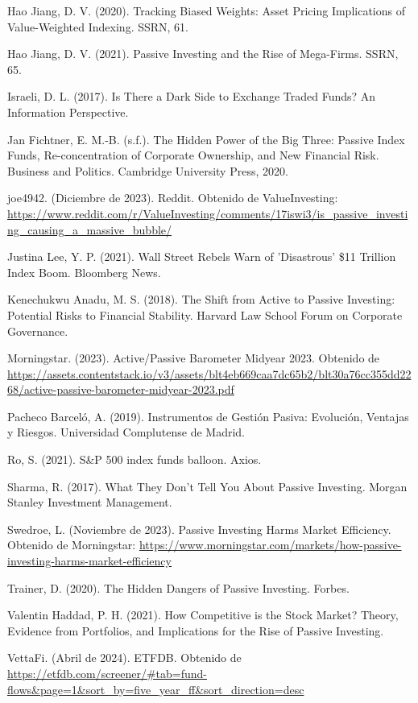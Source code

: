 \documentclass[12pt,a4paper]{article}
\begin{document}
\noindent
Hao Jiang, D. V. (2020). Tracking Biased Weights: Asset Pricing Implications of Value-Weighted Indexing. SSRN, 61.

\noindent
Hao Jiang, D. V. (2021). Passive Investing and the Rise of Mega-Firms. SSRN, 65.

\noindent
Israeli, D. L. (2017). Is There a Dark Side to Exchange Traded Funds? An Information Perspective.

\noindent
Jan Fichtner, E. M.-B. (s.f.). The Hidden Power of the Big Three: Passive Index Funds, Re-concentration of Corporate Ownership, and New Financial Risk. Business and Politics. Cambridge University Press, 2020.

\noindent
joe4942. (Diciembre de 2023). Reddit. Obtenido de ValueInvesting: \url{https://www.reddit.com/r/ValueInvesting/comments/17iswi3/is_passive_investing_causing_a_massive_bubble/}

\noindent
Justina Lee, Y. P. (2021). Wall Street Rebels Warn of 'Disastrous' \$11 Trillion Index Boom. Bloomberg News.

\noindent
Kenechukwu Anadu, M. S. (2018). The Shift from Active to Passive Investing: Potential Risks to Financial Stability. Harvard Law School Forum on Corporate Governance.

\noindent
Morningstar. (2023). Active/Passive Barometer Midyear 2023. Obtenido de \url{https://assets.contentstack.io/v3/assets/blt4eb669caa7dc65b2/blt30a76cc355dd2268/active-passive-barometer-midyear-2023.pdf}

\noindent
Pacheco Barceló, A. (2019). Instrumentos de Gestión Pasiva: Evolución, Ventajas y Riesgos. Universidad Complutense de Madrid.

\noindent
Ro, S. (2021). S\&P 500 index funds balloon. Axios.

\noindent
Sharma, R. (2017). What They Don't Tell You About Passive Investing. Morgan Stanley Investment Management.

\noindent
Swedroe, L. (Noviembre de 2023). Passive Investing Harms Market Efficiency. Obtenido de Morningstar: \url{https://www.morningstar.com/markets/how-passive-investing-harms-market-efficiency}

\noindent
Trainer, D. (2020). The Hidden Dangers of Passive Investing. Forbes.

\noindent
Valentin Haddad, P. H. (2021). How Competitive is the Stock Market? Theory, Evidence from Portfolios, and Implications for the Rise of Passive Investing.

\noindent
VettaFi. (Abril de 2024). ETFDB. Obtenido de \url{https://etfdb.com/screener/#tab=fund-flows&page=1&sort_by=five_year_ff&sort_direction=desc}
\end{document}
